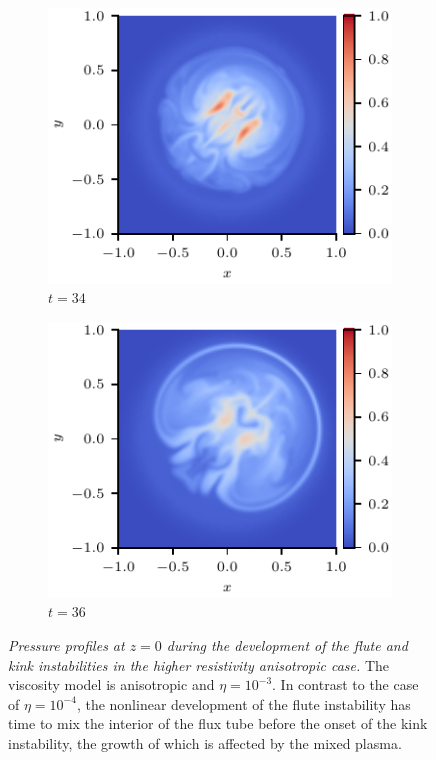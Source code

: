 \documentclass[fleqn,usenatbib]{mnras}
\newcommand{\mycaption}[2]{\caption[#1]{\emph{#1} #2}}
\begin{document}
\begin{figure}
\begin{subfigure}{0.32\textwidth}
      \includegraphics[width=\linewidth]{swi-3_pressure_17.pdf}
      \caption{$t=34$}
      \label{fig:swi-3_pressure_17}
    \end{subfigure}
    \hfill
    \begin{subfigure}{0.32\textwidth}
      \includegraphics[width=\linewidth]{swi-3_pressure_18.pdf}
      \caption{$t=36$}
      \label{fig:swi-3_pressure_18}
    \end{subfigure}
\mycaption{Pressure profiles at $z=0$ during the development of the flute and kink instabilities in the higher resistivity anisotropic case.}{The viscosity model is anisotropic and $\eta = 10^{-3}$. In contrast to the case of $\eta=10^{-4}$, the nonlinear development of the flute instability has time to mix the interior of the flux tube before the onset of the kink instability, the growth of which is affected by the mixed plasma.}
\label{fig:kink_pressure_slices-3}%
\end{figure}
\end{document}

